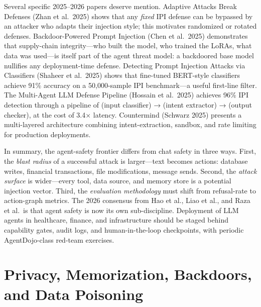Several specific 2025--2026 papers deserve mention. Adaptive Attacks Break Defenses (Zhan et al.~2025) shows that any \emph{fixed} IPI defense can be bypassed by an attacker who adapts their injection style; this motivates randomized or rotated defenses. Backdoor-Powered Prompt Injection (Chen et al.~2025) demonstrates that supply-chain integrity---who built the model, who trained the LoRAs, what data was used---is itself part of the agent threat model: a backdoored base model nullifies any deployment-time defense. Detecting Prompt Injection Attacks via Classifiers (Shaheer et al.~2025) shows that fine-tuned BERT-style classifiers achieve 91\% accuracy on a 50,000-sample IPI benchmark---a useful first-line filter. The Multi-Agent LLM Defense Pipeline (Hossain et al.~2025) achieves 96\% IPI detection through a pipeline of (input classifier) → (intent extractor) → (output checker), at the cost of 3.4× latency. Countermind (Schwarz 2025) presents a multi-layered architecture combining intent-extraction, sandbox, and rate limiting for production deployments.

In summary, the agent-safety frontier differs from chat safety in three ways. First, the \emph{blast radius} of a successful attack is larger---text becomes actions: database writes, financial transactions, file modifications, message sends. Second, the \emph{attack surface} is wider---every tool, data source, and memory store is a potential injection vector. Third, the \emph{evaluation methodology} must shift from refusal-rate to action-graph metrics. The 2026 consensus from Hao et al., Liao et al., and Raza et al.~is that agent safety is now its own sub-discipline. Deployment of LLM agents in healthcare, finance, and infrastructure should be staged behind capability gates, audit logs, and human-in-the-loop checkpoints, with periodic AgentDojo-class red-team exercises.

\section{Privacy, Memorization, Backdoors, and Data Poisoning}\label{privacy-memorization-backdoors-and-data-poisoning}


